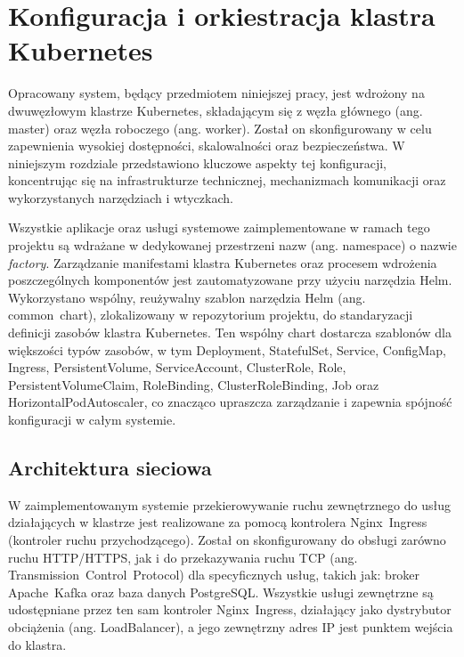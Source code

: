 \section{Konfiguracja i orkiestracja klastra Kubernetes}
\label{chap:konfiguracja_kubernetes}

Opracowany system, będący przedmiotem niniejszej pracy, jest wdrożony na dwuwęzłowym klastrze Kubernetes, składającym się z węzła głównego (ang. \mbox{master}) oraz węzła roboczego (ang. \mbox{worker}). Został on skonfigurowany w celu zapewnienia wysokiej dostępności, skalowalności oraz bezpieczeństwa. W niniejszym rozdziale przedstawiono kluczowe aspekty tej konfiguracji, koncentrując się na infrastrukturze technicznej, mechanizmach komunikacji oraz wykorzystanych narzędziach i wtyczkach.

Wszystkie aplikacje oraz usługi systemowe zaimplementowane w ramach tego projektu są wdrażane w dedykowanej przestrzeni nazw (ang. \mbox{namespace}) o nazwie \textit{factory}. Zarządzanie manifestami klastra Kubernetes oraz procesem wdrożenia poszczególnych komponentów jest zautomatyzowane przy użyciu narzędzia Helm. Wykorzystano wspólny, reużywalny szablon narzędzia Helm (ang. \mbox{common chart}), zlokalizowany w repozytorium projektu, do standaryzacji definicji zasobów klastra Kubernetes. Ten wspólny chart dostarcza szablonów dla większości typów zasobów, w tym \mbox{Deployment}, \mbox{StatefulSet}, \mbox{Service}, \mbox{ConfigMap}, \mbox{Ingress}, \mbox{PersistentVolume},  \mbox{ServiceAccount}, \mbox{ClusterRole},  \mbox{Role}, \mbox{PersistentVolumeClaim},   \mbox{RoleBinding},   \mbox{ClusterRoleBinding}, \mbox{Job} oraz \mbox{HorizontalPodAutoscaler}, co znacząco upraszcza zarządzanie i zapewnia spójność konfiguracji w całym systemie.

\subsection{Architektura sieciowa}

W zaimplementowanym systemie przekierowywanie ruchu zewnętrznego do usług działających w klastrze jest realizowane za pomocą kontrolera \mbox{Nginx Ingress} (kontroler ruchu przychodzącego). Został on skonfigurowany do obsługi zarówno ruchu \mbox{HTTP/HTTPS}, jak i do przekazywania ruchu TCP (ang. \mbox{Transmission Control Protocol}) \cite{tanenbaum2011computer} dla specyficznych usług, takich jak: broker \mbox{Apache Kafka} oraz baza danych \mbox{PostgreSQL}. Wszystkie usługi zewnętrzne są udostępniane przez ten sam kontroler \mbox{Nginx Ingress}, działający jako dystrybutor obciążenia (ang. \mbox{LoadBalancer}), a jego zewnętrzny adres IP jest punktem wejścia do klastra.

